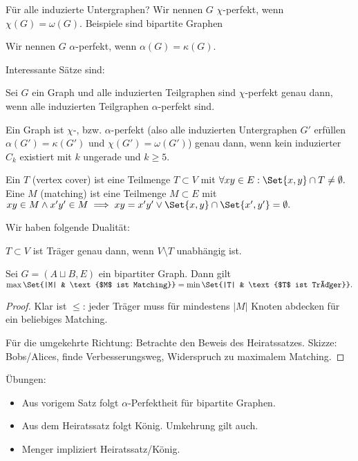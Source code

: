 Für alle induzierte Untergraphen?
Wir nennen $G$ $\chi$-perfekt, wenn $\chi(G) = \omega(G)$.
Beispiele sind bipartite Graphen

Wir nennen $G$ $\alpha$-perfekt, wenn $\alpha(G) = \kappa(G)$.

Interessante Sätze sind:

\begin{st}
    Sei $G$ ein Graph und alle induzierten Teilgraphen sind $\chi$-perfekt genau dann, wenn alle induzierten Teilgraphen $\alpha$-perfekt sind.
\end{st}

\begin{st}
    Ein Graph ist $\chi$-, bzw. $\alpha$-perfekt (also alle induzierten Untergraphen $G'$ erfüllen $\alpha(G') = \kappa(G')$ und $\chi(G') = \omega(G')$) genau dann, wenn kein induzierter $C_k$ existiert mit $k$ ungerade und $k \ge 5$.
\end{st}

\begin{df}
    Ein  $T$ (vertex cover) ist eine Teilmenge $T \subset V$ mit
    \begin{math}
        \forall xy \in E: \Set{x,y} \cap T \neq \emptyset.
    \end{math}
    Eine  $M$ (matching) ist eine Teilmenge $M \subset E$ mit
    \begin{math}
        xy \in M \land x'y' \in M \implies xy = x'y' \lor \Set{x,y} \cap \Set{x',y'} = \emptyset.
    \end{math}
\end{df}

Wir haben folgende Dualität:
\begin{lem}
    $T \subset V$ ist Träger genau dann, wenn $V \setminus T$ unabhängig ist.
\end{lem}

\begin{st}[König, 1931]
    Sei $G = (A \sqcup B, E)$ ein bipartiter Graph.
    Dann gilt
    \begin{math}
        \max\Set{|M| & \text{$M$ ist Matching}}
        = \min \Set{|T| & \text{$T$ ist Träger}}.
    \end{math}
    \begin{proof}
        Klar ist $\le$: jeder Träger muss für mindestens $|M|$ Knoten abdecken für ein beliebiges Matching.

        Für die umgekehrte Richtung: Betrachte den Beweis des Heiratssatzes.
        Skizze: Bobs/Alices, finde Verbesserungsweg, Widerspruch zu maximalem Matching.
    \end{proof}
\end{st}

\begin{ex}
    Übungen:
    \begin{itemize}
        \item
            Aus vorigem Satz folgt $\alpha$-Perfektheit für bipartite Graphen.
        \item
            Aus dem Heiratssatz folgt König.
            Umkehrung gilt auch.
        \item
            Menger impliziert Heiratssatz/König.
    \end{itemize}
\end{ex}
